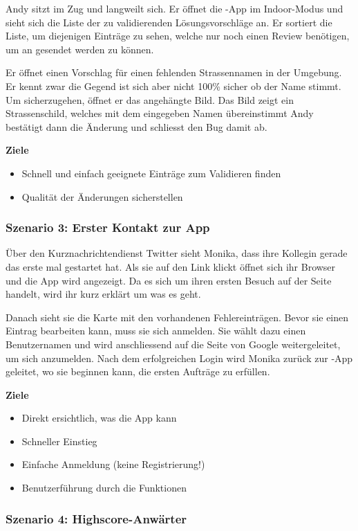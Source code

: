 Andy sitzt im Zug und langweilt sich.
Er öffnet die \kort{}-App im Indoor-Modus und sieht sich die Liste der zu validierenden Lösungsvorschläge an. 
Er sortiert die Liste, um diejenigen Einträge zu sehen, welche nur noch einen Review benötigen, um an  gesendet werden zu können.

Er öffnet einen Vorschlag für einen fehlenden Strassennamen in der Umgebung.
Er kennt zwar die Gegend ist sich aber nicht 100\% sicher ob der Name stimmt.
Um sicherzugehen, öffnet er das angehängte Bild.
Das Bild zeigt ein Strassenschild, welches mit dem eingegeben Namen übereinstimmt
Andy bestätigt dann die Änderung und schliesst den Bug damit ab.

\cleardoublepage
\textbf{Ziele}
\begin{itemize}
\item Schnell und einfach geeignete Einträge zum Validieren finden
\item Qualität der Änderungen sicherstellen
\end{itemize}

\subsubsection{Szenario 3: Erster Kontakt zur App}

Über den Kurznachrichtendienst Twitter sieht Monika, dass ihre Kollegin gerade das erste mal \kort{} gestartet hat.
Als sie auf den Link klickt öffnet sich ihr Browser und die App wird angezeigt.
Da es sich um ihren ersten Besuch auf der Seite handelt, wird ihr kurz erklärt um was es geht.

Danach sieht sie die Karte mit den vorhandenen Fehlereinträgen.
Bevor sie einen Eintrag bearbeiten kann, muss sie sich anmelden.
Sie wählt dazu einen Benutzernamen und wird anschliessend auf die Seite von Google weitergeleitet, um sich anzumelden.
Nach dem erfolgreichen Login wird Monika zurück zur \kort{}-App geleitet, wo sie beginnen kann, die ersten Aufträge zu erfüllen.

\textbf{Ziele}
\begin{itemize}
\item Direkt ersichtlich, was die App kann
\item Schneller Einstieg
\item Einfache Anmeldung (keine Registrierung!)
\item Benutzerführung durch die Funktionen
\end{itemize}

\subsubsection{Szenario 4: Highscore-Anwärter}

